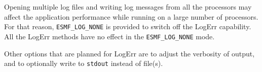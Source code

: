 Opening multiple log files and writing log messages from all the processors
may affect the application performance while running on a large number of
processors.  For that reason, {\tt ESMF\_LOG\_NONE} is provided to
switch off the LogErr capability.  All the LogErr methods have no effect
in the {\tt ESMF\_LOG\_NONE} mode. 
   
Other options that are planned for LogErr are to adjust the verbosity of output, and to optionally write to {\tt stdout} instead of file(s).




